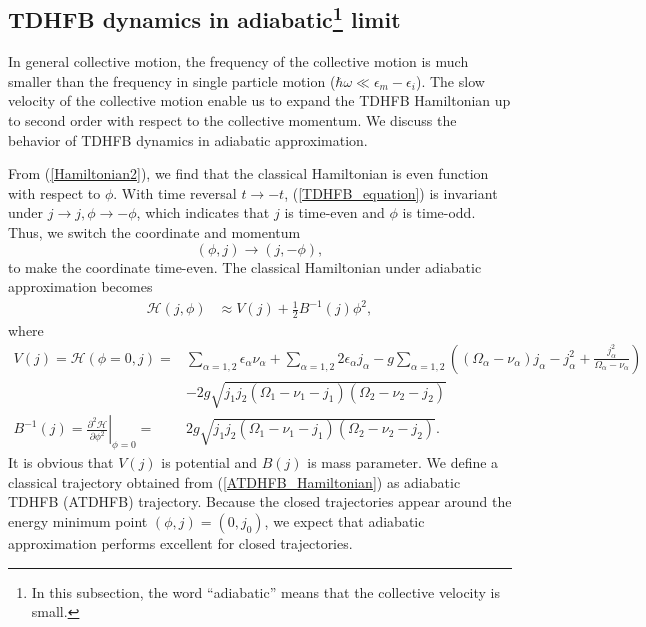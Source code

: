 \documentclass[11pt]{book} %
\begin{document}
\subsection{TDHFB dynamics in adiabatic\footnote{In this subsection, the word ``adiabatic'' means that the collective velocity is small.} limit}
\label{ATDHFB}
In general collective motion, the frequency of the collective motion is much smaller than the frequency in single particle motion ($\hbar\omega\ll\epsilon_m-\epsilon_i$). The slow velocity of the collective motion enable us to expand the TDHFB Hamiltonian up to second order with respect to the collective momentum. We discuss the behavior of TDHFB dynamics in adiabatic approximation.\par
From (\ref{Hamiltonian2}), we find that the classical Hamiltonian is even function with respect to $\phi$. With time reversal $t\to-t$, (\ref{TDHFB_equation}) is invariant under $j\to j, \phi\to -\phi$, which indicates that $j$ is time-even and $\phi$ is time-odd. Thus, we switch the coordinate and momentum 
\begin{equation}
	(\phi,j)\to(j,-\phi) ,
	\label{switch}
\end{equation}
to make the coordinate time-even. The classical Hamiltonian under adiabatic approximation becomes
\begin{align}
  \mathcal{H}(j,\phi) &\approx V(j) + \frac{1}{2}B^{-1}(j)\phi^2,
  \label{ATDHFB_Hamiltonian}
\end{align}
where 
\begin{align}
	V(j) = \mathcal{H}(\phi=0,j) 
	=& \sum_{\alpha=1,2} \epsilon_{\alpha}\nu_{\alpha} + \sum_{\alpha=1,2} 2\epsilon_{\alpha}j_{\alpha} - g\sum_{\alpha=1,2} \left( (\Omega_{\alpha}-\nu_{\alpha}) j_{\alpha} - j_{\alpha}^2 +\frac{j_{\alpha}^2}{\Omega_{\alpha}-\nu_{\alpha}} \right) \nonumber 
	\label{potential_two_level} \\
	&- 2g\sqrt{j_1j_2(\Omega_{1}-\nu_{1}-j_{1})(\Omega_{2}-\nu_{2}-j_{2})} \\
	B^{-1}(j) = \left. \frac{\partial^2\mathcal{H}}{\partial\phi^2} \right|_{\phi=0}
	=& 2g\sqrt{j_1j_2(\Omega_{1}-\nu_{1}-j_{1})(\Omega_{2}-\nu_{2}-j_{2})} .
	\label{mass_two_level}
\end{align}
It is obvious that $V(j)$ is potential and $B(j)$ is mass parameter. We define a classical trajectory obtained from (\ref{ATDHFB_Hamiltonian}) as adiabatic TDHFB (ATDHFB) trajectory. Because the closed trajectories appear around the energy minimum point $(\phi,j)=(0,j_0)$, we expect that adiabatic approximation performs excellent for closed trajectories.
\end{document}
